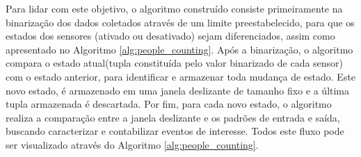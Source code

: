 Para lidar com este objetivo, o algoritmo construído consiste primeiramente na binarização dos dados coletados através de um limite preestabelecido, para que os estados dos sensores (ativado ou desativado) sejam diferenciados, assim como apresentado no Algoritmo \ref{alg:people_counting}. Após a binarização, o algoritmo compara o estado atual(tupla constituída pelo valor binarizado de cada sensor) com o estado anterior, para identificar e armazenar toda mudança de estado. Este novo estado, é armazenado em uma janela deslizante de tamanho fixo e a última tupla armazenada é descartada. Por fim, para cada novo estado, o algoritmo realiza a comparação entre a janela deslizante e os padrões de entrada e saída, buscando caracterizar e contabilizar eventos de interesse. Todos este fluxo pode ser visualizado através do Algoritmo \ref{alg:people_counting}.




